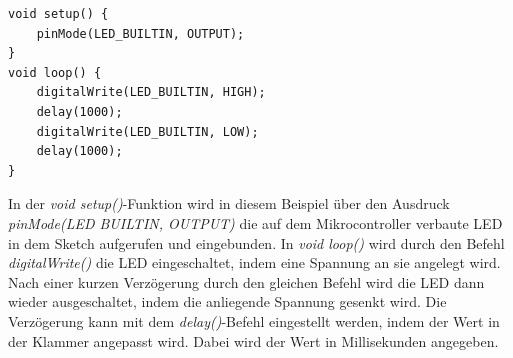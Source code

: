 \begin{lstlisting}
void setup() {
	pinMode(LED_BUILTIN, OUTPUT);
}
void loop() {
	digitalWrite(LED_BUILTIN, HIGH);
	delay(1000);                     
	digitalWrite(LED_BUILTIN, LOW);  
	delay(1000);                     
}
\end{lstlisting}

In der \textit{void setup()}-Funktion wird in diesem Beispiel über den Ausdruck \textit{pinMode(LED BUILTIN, OUTPUT)} die auf dem Mikrocontroller verbaute LED in dem Sketch aufgerufen und eingebunden.
In \textit{void loop()} wird durch den Befehl\textit{ digitalWrite()} die LED eingeschaltet, indem eine Spannung an sie angelegt wird. Nach einer kurzen Verzögerung durch den gleichen Befehl wird die LED dann wieder ausgeschaltet, indem die anliegende Spannung gesenkt wird. Die Verzögerung kann mit dem \textit{delay()}-Befehl eingestellt werden, indem der Wert in der Klammer angepasst wird. Dabei wird der Wert in Millisekunden angegeben.

